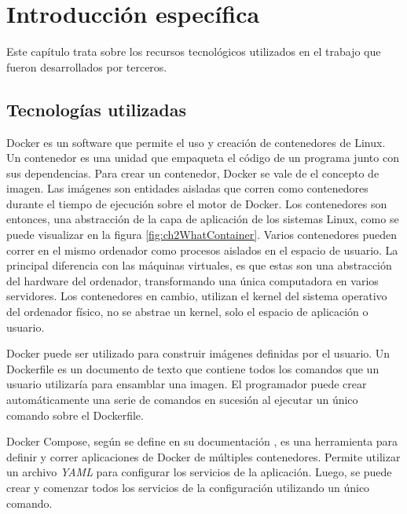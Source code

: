 \chapter{Introducción específica} %

\label{Chapter2}

Este capítulo trata sobre los recursos tecnológicos utilizados en el trabajo que fueron desarrollados por terceros.

\section{Tecnologías utilizadas}

Docker es un software que permite el uso y creación de contenedores de Linux.
Un contenedor es una unidad que empaqueta el código de un programa junto con sus dependencias.
Para crear un contenedor, Docker se vale de el concepto de imagen.
Las imágenes son entidades aisladas que corren como contenedores durante el tiempo de ejecución sobre el motor de Docker.
Los contenedores son entonces, una abstracción de la capa de aplicación de los sistemas Linux, como se puede visualizar en la figura \ref{fig:ch2WhatContainer}.
Varios contenedores pueden correr en el mismo ordenador como procesos aislados en el espacio de usuario.
La principal diferencia con las máquinas virtuales, es que estas son una abstracción del hardware del ordenador, transformando una única computadora en varios servidores.
Los contenedores en cambio, utilizan el kernel del sistema operativo del ordenador físico, no se abstrae un kernel, solo el espacio de aplicación o usuario.

Docker puede ser utilizado para construir imágenes definidas por el usuario.
Un Dockerfile es un documento de texto que contiene todos los comandos que un usuario utilizaría para ensamblar una imagen.
El programador puede crear automáticamente una serie de comandos en sucesión al ejecutar un único comando sobre el Dockerfile. 

Docker Compose, según se define en su documentación \citep{WEBSITE:WhatDockerCompose}, es una herramienta para definir y correr aplicaciones de Docker de múltiples contenedores.
Permite utilizar un archivo \emph{YAML} para configurar los servicios de la aplicación.
Luego, se puede crear y comenzar todos los servicios de la configuración utilizando un único comando.

